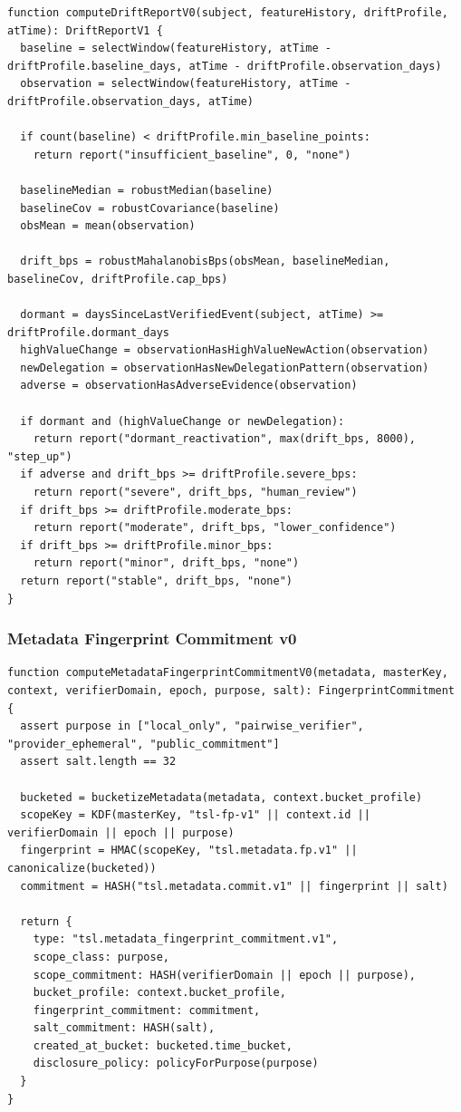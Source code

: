 \documentclass[11pt]{article}
\begin{document}
\begin{lstlisting}[style=tslcode]
function computeDriftReportV0(subject, featureHistory, driftProfile, atTime): DriftReportV1 {
  baseline = selectWindow(featureHistory, atTime - driftProfile.baseline_days, atTime - driftProfile.observation_days)
  observation = selectWindow(featureHistory, atTime - driftProfile.observation_days, atTime)

  if count(baseline) < driftProfile.min_baseline_points:
    return report("insufficient_baseline", 0, "none")

  baselineMedian = robustMedian(baseline)
  baselineCov = robustCovariance(baseline)
  obsMean = mean(observation)

  drift_bps = robustMahalanobisBps(obsMean, baselineMedian, baselineCov, driftProfile.cap_bps)

  dormant = daysSinceLastVerifiedEvent(subject, atTime) >= driftProfile.dormant_days
  highValueChange = observationHasHighValueNewAction(observation)
  newDelegation = observationHasNewDelegationPattern(observation)
  adverse = observationHasAdverseEvidence(observation)

  if dormant and (highValueChange or newDelegation):
    return report("dormant_reactivation", max(drift_bps, 8000), "step_up")
  if adverse and drift_bps >= driftProfile.severe_bps:
    return report("severe", drift_bps, "human_review")
  if drift_bps >= driftProfile.moderate_bps:
    return report("moderate", drift_bps, "lower_confidence")
  if drift_bps >= driftProfile.minor_bps:
    return report("minor", drift_bps, "none")
  return report("stable", drift_bps, "none")
}
\end{lstlisting}

\subsubsection{Metadata Fingerprint Commitment v0}

\begin{lstlisting}[style=tslcode]
function computeMetadataFingerprintCommitmentV0(metadata, masterKey, context, verifierDomain, epoch, purpose, salt): FingerprintCommitment {
  assert purpose in ["local_only", "pairwise_verifier", "provider_ephemeral", "public_commitment"]
  assert salt.length == 32

  bucketed = bucketizeMetadata(metadata, context.bucket_profile)
  scopeKey = KDF(masterKey, "tsl-fp-v1" || context.id || verifierDomain || epoch || purpose)
  fingerprint = HMAC(scopeKey, "tsl.metadata.fp.v1" || canonicalize(bucketed))
  commitment = HASH("tsl.metadata.commit.v1" || fingerprint || salt)

  return {
    type: "tsl.metadata_fingerprint_commitment.v1",
    scope_class: purpose,
    scope_commitment: HASH(verifierDomain || epoch || purpose),
    bucket_profile: context.bucket_profile,
    fingerprint_commitment: commitment,
    salt_commitment: HASH(salt),
    created_at_bucket: bucketed.time_bucket,
    disclosure_policy: policyForPurpose(purpose)
  }
}
\end{lstlisting}
\end{document}
